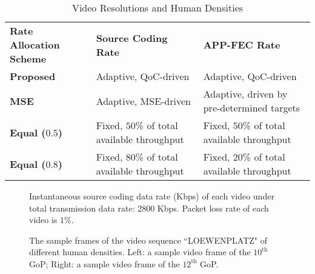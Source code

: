 \documentclass[journal]{IEEEtran}
\begin{document}
\begin{table}[t]
\renewcommand{\arraystretch}{1.3}
\caption{Video Resolutions and Human Densities}
\begin{center}
\begin{tabular}{|p{1.9cm}!{\vrule width 2pt}p{2.7cm}|p{2.7cm}|}
\hline
\textbf{Rate Allocation Scheme} & \textbf{Source Coding Rate} & \textbf{APP-FEC Rate} \\ 
\textbf{Proposed} & Adaptive, QoC-driven & Adaptive, QoC-driven \\ \hline
\textbf{MSE} & Adaptive, MSE-driven & Adaptive, driven by pre-determined targets \\ \hline 
\textbf{Equal ($0.5$)} & Fixed, $50$\% of total available throughput  & Fixed, $50$\% of total available throughput \\ \hline
\textbf{Equal ($0.8$)} &Fixed, $80$\% of total available throughput &Fixed, $20$\% of total available throughput \\
\hline
\end{tabular}
\end{center}
\label{Table: schemes}
\end{table}


\begin{figure}[t]
\caption{Instantaneous source coding data rate (Kbps) of each video under total transmission data rate: 2800 Kbps. Packet loss rate of each video is $1\%$.}\label{fig:inst_dataRate_2800_1}
\end{figure}
\begin{figure}[t]
\caption{The sample frames of the video sequence ``LOEWENPLATZ" of different human densities. Left: a sample video frame of the $10^{\text{th}}$ GoP; Right: a sample video frame of the $12^{\text{th}}$ GoP.}
\label{fig:humanDensityChange_1}
\end{figure}
\end{document}
